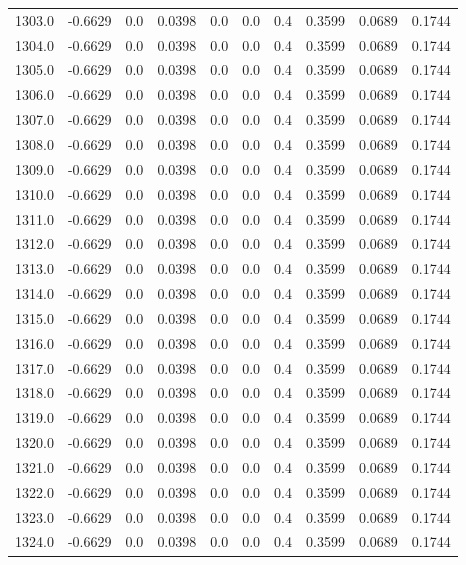 \begin{longtable}{lrrrrrrrrr}
1303.0 & -0.6629 & 0.0 & 0.0398 & 0.0 & 0.0 & 0.4 & 0.3599 & 0.0689 & 0.1744 \\
1304.0 & -0.6629 & 0.0 & 0.0398 & 0.0 & 0.0 & 0.4 & 0.3599 & 0.0689 & 0.1744 \\
1305.0 & -0.6629 & 0.0 & 0.0398 & 0.0 & 0.0 & 0.4 & 0.3599 & 0.0689 & 0.1744 \\
1306.0 & -0.6629 & 0.0 & 0.0398 & 0.0 & 0.0 & 0.4 & 0.3599 & 0.0689 & 0.1744 \\
1307.0 & -0.6629 & 0.0 & 0.0398 & 0.0 & 0.0 & 0.4 & 0.3599 & 0.0689 & 0.1744 \\
1308.0 & -0.6629 & 0.0 & 0.0398 & 0.0 & 0.0 & 0.4 & 0.3599 & 0.0689 & 0.1744 \\
1309.0 & -0.6629 & 0.0 & 0.0398 & 0.0 & 0.0 & 0.4 & 0.3599 & 0.0689 & 0.1744 \\
1310.0 & -0.6629 & 0.0 & 0.0398 & 0.0 & 0.0 & 0.4 & 0.3599 & 0.0689 & 0.1744 \\
1311.0 & -0.6629 & 0.0 & 0.0398 & 0.0 & 0.0 & 0.4 & 0.3599 & 0.0689 & 0.1744 \\
1312.0 & -0.6629 & 0.0 & 0.0398 & 0.0 & 0.0 & 0.4 & 0.3599 & 0.0689 & 0.1744 \\
1313.0 & -0.6629 & 0.0 & 0.0398 & 0.0 & 0.0 & 0.4 & 0.3599 & 0.0689 & 0.1744 \\
1314.0 & -0.6629 & 0.0 & 0.0398 & 0.0 & 0.0 & 0.4 & 0.3599 & 0.0689 & 0.1744 \\
1315.0 & -0.6629 & 0.0 & 0.0398 & 0.0 & 0.0 & 0.4 & 0.3599 & 0.0689 & 0.1744 \\
1316.0 & -0.6629 & 0.0 & 0.0398 & 0.0 & 0.0 & 0.4 & 0.3599 & 0.0689 & 0.1744 \\
1317.0 & -0.6629 & 0.0 & 0.0398 & 0.0 & 0.0 & 0.4 & 0.3599 & 0.0689 & 0.1744 \\
1318.0 & -0.6629 & 0.0 & 0.0398 & 0.0 & 0.0 & 0.4 & 0.3599 & 0.0689 & 0.1744 \\
1319.0 & -0.6629 & 0.0 & 0.0398 & 0.0 & 0.0 & 0.4 & 0.3599 & 0.0689 & 0.1744 \\
1320.0 & -0.6629 & 0.0 & 0.0398 & 0.0 & 0.0 & 0.4 & 0.3599 & 0.0689 & 0.1744 \\
1321.0 & -0.6629 & 0.0 & 0.0398 & 0.0 & 0.0 & 0.4 & 0.3599 & 0.0689 & 0.1744 \\
1322.0 & -0.6629 & 0.0 & 0.0398 & 0.0 & 0.0 & 0.4 & 0.3599 & 0.0689 & 0.1744 \\
1323.0 & -0.6629 & 0.0 & 0.0398 & 0.0 & 0.0 & 0.4 & 0.3599 & 0.0689 & 0.1744 \\
1324.0 & -0.6629 & 0.0 & 0.0398 & 0.0 & 0.0 & 0.4 & 0.3599 & 0.0689 & 0.1744 \\

\end{longtable}
